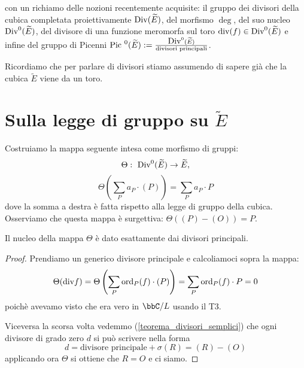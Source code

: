 
 con un richiamo delle nozioni recentemente acquisite: il gruppo dei divisori della cubica completata proiettivamente $\mbox{Div}(\widetilde{E})$, del morfismo $\deg$, del suo nucleo $\mbox{Div}^0(\widetilde{E})$, del divisore di una funzione meromorfa sul toro $\mbox{div}(f)\in\mbox{Div}^0(\widetilde{E})$ e infine del gruppo di Picenni $\mbox{Pic }^0(\widetilde{E}) := \frac{\mbox{Div}^0(\widetilde{E})}{\text{divisori principali}}$.

Ricordiamo che per parlare di divisori stiamo assumendo di sapere già che la cubica $\widetilde{E}$ viene da un toro.

\section{Sulla legge di gruppo su $\widetilde{E}$}
Costruiamo la mappa seguente intesa come morfismo di gruppi:
$$
\Theta: \ \mbox{Div}^0(\widetilde{E})\rightarrow \widetilde{E},
$$
$$
\Theta\left(\sum_P a_P \cdot (P)\right)=\sum_P a_P \cdot P
$$
dove la somma a destra è fatta rispetto alla legge di gruppo della cubica.
Osserviamo che questa mappa è surgettiva: $\Theta((P)-(O))=P$.


\begin{lemma}
Il nucleo della mappa $\Theta$ è dato esattamente dai divisori principali.
\end{lemma}
\begin{proof}
Prendiamo un generico divisore principale e calcoliamoci sopra la mappa:
$$
\Theta(\mbox{div} f)=\Theta\left(\sum_P \text{ord}_P(f) \cdot (P)\right)=\sum_P \text{ord}_P(f)\cdot P=0
$$
poichè avevamo visto che era vero in $\bbC/L$ usando il T3.

Viceversa la scorsa volta vedemmo (\ref{teorema_divisori_semplici}) che ogni divisore di grado zero $d$ si può scrivere nella forma
$$ d = \mbox{divisore principale} + \sigma(R) = (R) - (O) $$
applicando ora $\Theta$ si ottiene che $R=O$ e ci siamo.
\end{proof}


